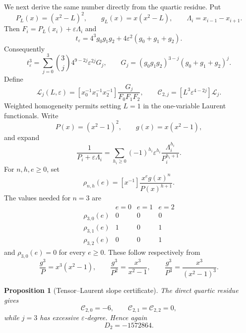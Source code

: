 \documentclass[11pt]{article}
\newtheorem{proposition}[theorem]{Proposition}
\theoremstyle{definition}
\begin{document}
{We next derive the same number directly from the quartic residue. Put
\[
P_L(x)=(x^2-L)^2,
\qquad
g_L(x)=x(x^2-L),
\qquad
\Lambda_i=x_{i-1}-x_{i+1}.
\]
Then $F_i=P_L(x_i)+\varepsilon\Lambda_i$ and
\[
t_\varepsilon
=4^3g_0g_1g_2+4\varepsilon^2(g_0+g_1+g_2).
\]
Consequently
\begin{equation}
t_\varepsilon^3
=
\sum_{j=0}^3
\binom3j4^{9-2j}\varepsilon^{2j}G_j,
\qquad
G_j=(g_0g_1g_2)^{3-j}(g_0+g_1+g_2)^j.
\label{eq:t3-Gj}
\end{equation}
Define
\begin{equation}
\mathcal L_j(L,\varepsilon)
=
[x_0^{-1}x_1^{-1}x_2^{-1}]
\frac{G_j}{F_0F_1F_2},
\qquad
\mathcal C_{2,j}
=
[L^3\varepsilon^{4-2j}]\mathcal L_j.
\label{eq:C2j}
\end{equation}
Weighted homogeneity permits setting $L=1$ in the one-variable Laurent functionals. Write
\[
P(x)=(x^2-1)^2,
\qquad
g(x)=x(x^2-1),
\]
and expand
\begin{equation}
\frac1{P_i+\varepsilon\Lambda_i}
=
\sum_{h_i\ge0}(-1)^{h_i}\varepsilon^{h_i}
\frac{\Lambda_i^{h_i}}{P_i^{h_i+1}}.
\label{eq:denominator-expansion}
\end{equation}
For $n,h,e\ge0$, set
\begin{equation}
\rho_{n,h}(e)
=
[x^{-1}]\frac{x^eg(x)^n}{P(x)^{h+1}}.
\label{eq:rho-def}
\end{equation}
The values needed for $n=3$ are
\begin{equation}
\begin{array}{c|ccc}
 &e=0&e=1&e=2\\ \hline
\rho_{3,0}(e)&0&0&0\\
\rho_{3,1}(e)&1&0&1\\
\rho_{3,2}(e)&0&0&1
\end{array}
\label{eq:rho-values}
\end{equation}
and $\rho_{3,0}(e)=0$ for every $e\ge0$. These follow respectively from
\[
\frac{g^3}{P}=x^3(x^2-1),
\qquad
\frac{g^3}{P^2}=\frac{x^3}{x^2-1},
\qquad
\frac{g^3}{P^3}=\frac{x^3}{(x^2-1)^3}.
\]

\begin{proposition}[Tensor--Laurent slope certificate]
\label{prop:second-slope}
The direct quartic residue gives
\[
\mathcal C_{2,0}=-6,
\qquad
\mathcal C_{2,1}=\mathcal C_{2,2}=0,
\]
while $j=3$ has excessive $\varepsilon$-degree. Hence again
\[
D_2=-1572864.
\]
\end{proposition}

}
\end{document}
